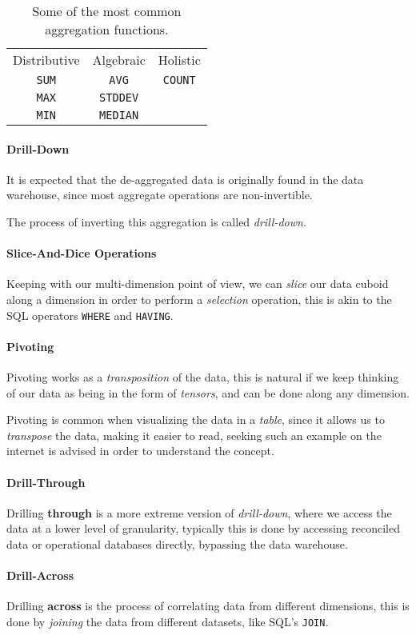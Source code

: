 \documentclass[openright, twoside, twocolumn]{report}
\begin{document}
\begin{table}[h!]
  \centering
  \begin{tabular}{c c c}
      \rowcolor{gray!50}
      Distributive & Algebraic &  Holistic \\
      \texttt{SUM} & \texttt{AVG} &  \texttt{COUNT} \\
      \texttt{MAX} & \texttt{STDDEV} &   \\
      \texttt{MIN} & \texttt{MEDIAN} & \\
  \end{tabular}
  \caption{Some of the most common aggregation functions.}\label{tab:aggregate}
\end{table}

\paragraph{Drill-Down} 
It is expected that the de-aggregated data is originally found in the data warehouse, 
since most aggregate operations are non-invertible.

The process of inverting this aggregation is called \emph{drill-down}.

\paragraph{Slice-And-Dice Operations}

Keeping with our multi-dimension point of view, we can \emph{slice} our data cuboid 
along a dimension in order to perform a \emph{selection} operation, this 
is akin to the SQL operators \texttt{WHERE} and \texttt{HAVING}.

\paragraph{Pivoting} 
Pivoting works as a \emph{transposition} of the data, this is natural if we keep thinking 
of our data as being in the form of \emph{tensors}, and can be done along any dimension.

Pivoting is common when visualizing the data in a \emph{table}, since it allows us to
\emph{transpose} the data, making it easier to read, seeking such an example 
on the internet is advised in order to understand the concept.

\paragraph{Drill-Through} 
Drilling \textbf{through} is a more extreme version of \emph{drill-down}, where we
access the data at a lower level of granularity, typically this is done by
accessing reconciled data or operational databases directly, bypassing the data
warehouse.

\paragraph{Drill-Across}

Drilling \textbf{across} is the process of correlating data from different dimensions,
this is done by \emph{joining} the data from different datasets, like SQL's \texttt{JOIN}.
\end{document}
